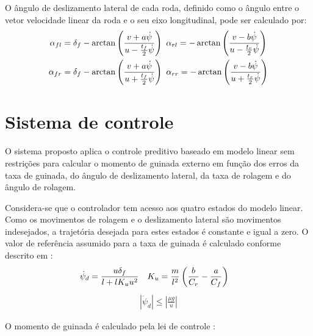 O ângulo de deslizamento lateral de cada roda, definido como o ângulo entre o
vetor velocidade linear da roda e o seu eixo longitudinal, pode ser calculado
por:
\begin{equation}
	\label{eq:alphaall}
	\begin{split}
		\alpha_{fl} = \delta_f - \arctan\left(\frac{v + a\dot{\psi}}{u -
		\frac{t_f}{2}\dot{\psi}}\right)  & \enskip \alpha_{rl} = -
		\arctan\left(\frac{v - b\dot{\psi}}{u - \frac{t_r}{2}\dot{\psi}}\right)\\
		\alpha_{fr}  = \delta_f - \arctan\left(\frac{v + a\dot{\psi}}{u +
		\frac{t_f}{2}\dot{\psi}}\right)  & \enskip  \alpha_{rr} = - \arctan\left(\frac{v - b\dot{\psi}}{u +
        \frac{t_r}{2}\dot{\psi}}\right)\\
	\end{split}
\end{equation}

\section{Sistema de controle}
\label{sec:control}
    
O sistema proposto aplica o controle preditivo baseado em modelo linear
sem restrições para calcular o momento de guinada externo em função dos erros
da taxa de guinada, do ângulo de deslizamento lateral, da taxa de rolagem
e do ângulo de rolagem.

Considera-se que o controlador tem acesso aos quatro estados do modelo linear.
Como os movimentos de rolagem e o deslizamento lateral são movimentos
indesejados, a trajetória desejada para estes estados é constante e igual a
zero.
O valor de referência assumido para a taxa de guinada é calculado conforme 
descrito em \cite{Jin2017,Zheng2006}:
\begin{equation}
	\label{eq:desiredyaw}
	\begin{split}
		\dot{\psi}_d  = \frac{u\delta_f}{l+lK_uu^2} \enskip&\enskip 
		K_u = \frac{m}{l^2}\left(\frac{b}{C_r} - \frac{a}{C_f}\right)
	\end{split}
\end{equation}
\begin{equation}
	\begin{split}
		|\dot{\psi}_d| \leq \left|\frac{\mu g}{u}\right| 
	\end{split}
\end{equation}

O  momento de guinada é calculado pela lei de controle :

